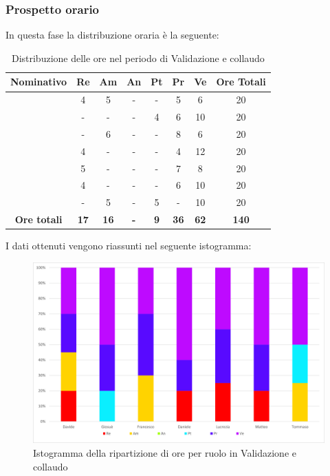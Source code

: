 \subsubsection{Prospetto orario}
In questa fase la distribuzione oraria è la seguente:
\begin{table}[H]
		\begin{center}
			\setlength{\aboverulesep}{0pt}
			\setlength{\belowrulesep}{0pt}
			\setlength{\extrarowheight}{.75ex}
			\begin{tabular}{ c c c c c c c c }
				\rowcolor{AzzurroGruppo!30} 
				\textbf{Nominativo} & \textbf{Re} & \textbf{Am} & \textbf{An} & \textbf{Pt} & \textbf{Pr} & \textbf{Ve} & \textbf{Ore Totali}  \\
				\toprule
				\Davide    & 4 & 5 & - & - & 5 & 6 & 20 \\
				\Giosue    & - & - & - & 4 & 6 & 10 & 20 \\
				\Francesco & - & 6 & - & - & 8 & 6 & 20\\
				\Daniele   & 4 & - & - & - & 4 & 12 & 20\\
				\Lucrezia  & 5 & - & - & - & 7 & 8 & 20\\
				\Matteo    & 4 & - & - & - & 6 & 10 & 20\\
				\Tommaso   & - & 5 & - & 5 & - & 10 & 20\\
				 \textbf{Ore totali} & \textbf{17} & \textbf{16} & \textbf{-} & \textbf{9} & \textbf{36} & \textbf{62} & \textbf{140} \\
				\bottomrule
			\end{tabular}
			\caption{Distribuzione delle ore nel periodo di Validazione e collaudo}
		\end{center}
	\end{table}
	I dati ottenuti vengono riassunti nel seguente istogramma:
	\begin{figure}[H]
    \centering
    \includegraphics[scale = 0.5]{components/img/Sprint-10-11-isto.png}
    \caption{Istogramma della ripartizione di ore per ruolo in Validazione e collaudo}
    \label{fig:istogramma ripartizione ore , fase di Validazione e Collaudo}
\end{figure}
